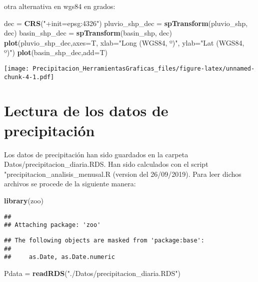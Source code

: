 \documentclass[]{article}
\newenvironment{Shaded}{\begin{snugshade}}{\end{snugshade}}
\newcommand{\DataTypeTok}[1]{\textcolor[rgb]{0.13,0.29,0.53}{#1}}
\newcommand{\KeywordTok}[1]{\textcolor[rgb]{0.13,0.29,0.53}{\textbf{#1}}}
\newcommand{\NormalTok}[1]{#1}
\newcommand{\StringTok}[1]{\textcolor[rgb]{0.31,0.60,0.02}{#1}}
\begin{document}
otra alternativa en wgs84 en grados:

\begin{Shaded}
\begin{Highlighting}[]
\NormalTok{dec =}\StringTok{ }\KeywordTok{CRS}\NormalTok{(}\StringTok{"+init=epsg:4326"}\NormalTok{)}
\NormalTok{pluvio_shp_dec =}\StringTok{ }\KeywordTok{spTransform}\NormalTok{(pluvio_shp, dec)}
\NormalTok{basin_shp_dec =}\StringTok{ }\KeywordTok{spTransform}\NormalTok{(basin_shp, dec)}
\KeywordTok{plot}\NormalTok{(pluvio_shp_dec,}\DataTypeTok{axes=}\NormalTok{T, }\DataTypeTok{xlab=}\StringTok{"Long (WGS84, º)"}\NormalTok{, }\DataTypeTok{ylab=}\StringTok{"Lat (WGS84, º)"}\NormalTok{)}
\KeywordTok{plot}\NormalTok{(basin_shp_dec,}\DataTypeTok{add=}\NormalTok{T)}
\end{Highlighting}
\end{Shaded}

\texttt{[image: Precipitacion\_HerramientasGraficas\_files/figure-latex/unnamed-chunk-4-1.pdf]}

\hypertarget{lectura-de-los-datos-de-precipitacion}{%
\section{Lectura de los datos de
precipitación}\label{lectura-de-los-datos-de-precipitacion}}

Los datos de precipitación han sido guardados en la carpeta
Datos/precipitacion\_diaria.RDS. Han sido calculados con el script
"precipitacion\_analisis\_menusal.R (version del 26/09/2019). Para leer
dichos archivos se procede de la siguiente manera:

\begin{Shaded}
\begin{Highlighting}[]
\KeywordTok{library}\NormalTok{(zoo)}
\end{Highlighting}
\end{Shaded}

\begin{verbatim}
## 
## Attaching package: 'zoo'
\end{verbatim}

\begin{verbatim}
## The following objects are masked from 'package:base':
## 
##     as.Date, as.Date.numeric
\end{verbatim}

\begin{Shaded}
\begin{Highlighting}[]
\NormalTok{Pdata =}\StringTok{ }\KeywordTok{readRDS}\NormalTok{(}\StringTok{"./Datos/precipitacion_diaria.RDS"}\NormalTok{)}
\end{Highlighting}
\end{Shaded}
\end{document}

